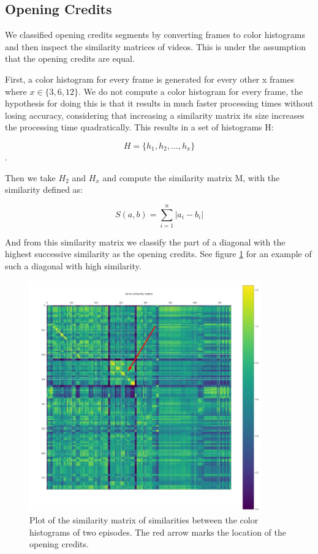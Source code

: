 \documentclass{article}
\begin{document}
\subsection{Opening Credits}
We classified opening credits segments by converting frames to color histograms and then inspect the similarity matrices of videos. This is under the assumption that the opening credits are equal.

First, a color histogram for every frame is generated for every other x frames where $x \in \{3,6,12\}$. We do not compute a color histogram for every frame, the hypothesis for doing this is that it results in much faster processing times without losing accuracy, considering that increasing a similarity matrix its size increases the processing time quadratically. This results in a set of histograms H: 

\[H = \{h_1, h_2, \dots, h_x\}\]. 

Then we take $H_2$ and $H_x$ and compute the similarity matrix M, with the similarity defined as:

\[S({a, b}) = \sum_{i = 1}^{n} |a_i - b_i| \]

And from this similarity matrix we classify the part of a diagonal with the highest successive similarity as the opening credits. See figure \ref{simmatrix} for an example of such a diagonal with high similarity.

\begin{figure}[H]
	\includegraphics[width=10cm]{images/simmatrixarrow.jpg}
	\centering
	\caption{Plot of the similarity matrix of similarities between the color histograms of two episodes. The red arrow marks the location of the opening credits.}
	\label{simmatrix}
\end{figure}
\end{document}
